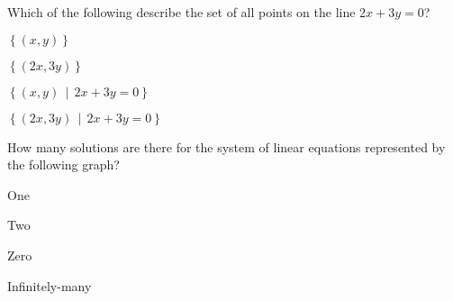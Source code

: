 \begin{readinessAssuranceTest}

%
%

\item Which of the following describe the set of all points on the line \(2x+3y=0\)?
\begin{multicols}{4}
\begin{readinessAssuranceTestChoices}
\item \(\displaystyle \left\{ (x,y) \right\}\)
\item \(\displaystyle \left\{ (2x,3y) \right\}\)
\item \(\displaystyle \left\{ (x,y) \,\middle|\, 2x+3y=0 \right\}\) %
\item \(\displaystyle \left\{ (2x,3y) \,\middle|\, 2x+3y=0 \right\}\)
\end{readinessAssuranceTestChoices}
\end{multicols}


\item How many solutions are there for the system of linear equations
      represented by the following graph?
    \begin{center}
      \systemWithOneSolutionB[0.23]
    \end{center}

\begin{multicols}{4}
\begin{readinessAssuranceTestChoices}
\item One %
\item Two
\item Zero
\item Infinitely-many
\end{readinessAssuranceTestChoices}
\end{multicols}


\end{readinessAssuranceTest}
